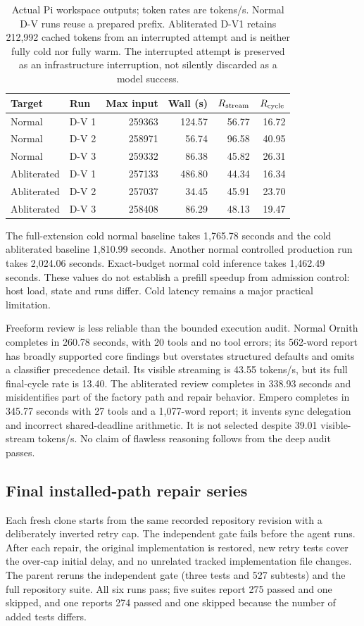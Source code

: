 \documentclass[11pt]{article}
\begin{document}
\begin{table}[H]\centering\small
\begin{tabular}{llrrrr}\toprule
Target & Run & Max input & Wall (s) & $R_{\rm stream}$ & $R_{\rm cycle}$\\\midrule
Normal & D-V 1 & 259363 &124.57&56.77&16.72\\
Normal & D-V 2 & 258971 &56.74&96.58&40.95\\
Normal & D-V 3 & 259332 &86.38&45.82&26.31\\
Abliterated & D-V 1 &257133&486.80&44.34&16.34\\
Abliterated & D-V 2 &257037&34.45&45.91&23.70\\
Abliterated & D-V 3 &258408&86.29&48.13&19.47\\\bottomrule
\end{tabular}
\caption{Actual Pi workspace outputs; token rates are tokens/s. Normal D-V runs reuse a prepared prefix. Abliterated D-V1 retains 212,992 cached tokens from an interrupted attempt and is neither fully cold nor fully warm. The interrupted attempt is preserved as an infrastructure interruption, not silently discarded as a model success.}
\end{table}

The full-extension cold normal baseline takes 1,765.78 seconds and the cold abliterated baseline 1,810.99 seconds. Another normal controlled production run takes 2,024.06 seconds. Exact-budget normal cold inference takes 1,462.49 seconds. These values do not establish a prefill speedup from admission control: host load, state and runs differ. Cold latency remains a major practical limitation.

Freeform review is less reliable than the bounded execution audit. Normal Ornith completes in 260.78 seconds, with 20 tools and no tool errors; its 562-word report has broadly supported core findings but overstates structured defaults and omits a classifier precedence detail. Its visible streaming is 43.55 tokens/s, but its full final-cycle rate is 13.40. The abliterated review completes in 338.93 seconds and misidentifies part of the factory path and repair behavior. Empero completes in 345.77 seconds with 27 tools and a 1,077-word report; it invents sync delegation and incorrect shared-deadline arithmetic. It is not selected despite 39.01 visible-stream tokens/s. No claim of flawless reasoning follows from the deep audit passes.

\subsection{Final installed-path repair series}
Each fresh clone starts from the same recorded repository revision with a deliberately inverted retry cap. The independent gate fails before the agent runs. After each repair, the original implementation is restored, new retry tests cover the over-cap initial delay, and no unrelated tracked implementation file changes. The parent reruns the independent gate (three tests and 527 subtests) and the full repository suite. All six runs pass; five suites report 275 passed and one skipped, and one reports 274 passed and one skipped because the number of added tests differs.
\end{document}
